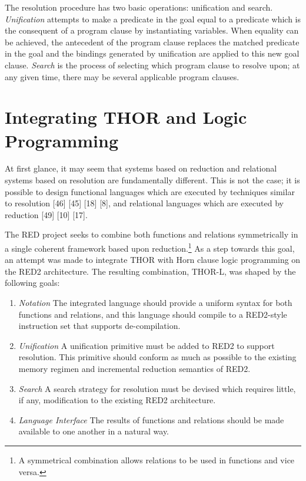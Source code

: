 The resolution procedure has two basic operations: unification and search.
\emph{Unification} attempts to make a predicate in the goal equal to a predicate which
is the consequent of a program clause by instantiating variables. When equality
can be achieved, the antecedent of the program clause replaces the matched
predicate in the goal and the bindings generated by unification are applied to
this new goal clause. \emph{Search} is the process of selecting which program clause to
resolve upon; at any given time, there may be several applicable program
clauses.

\section{Integrating THOR and Logic Programming}

At first glance, it may seem that \lambdacalculus{} systems based on reduction
and relational systems based on resolution are fundamentally different. This is
not the case; it is possible to design functional languages which are executed
by techniques similar to resolution [46] [45] [18] [8], and relational languages
which are executed by reduction [49] [10] [17].

The RED project seeks to combine both functions and relations symmetrically in a
single coherent framework based upon reduction.\footnote{A symmetrical
combination allows relations to be used in functions and vice versa.} As a step
towards this goal, an attempt was made to integrate THOR with Horn clause logic
programming on the RED2 architecture. The resulting combination, THOR-L, was
shaped by the following goals:

\begin{enumerate}
\item \emph{Notation} The integrated language should provide a uniform syntax
for both functions and relations, and this language should compile to a
RED2-style instruction set that supports de-compilation.
\item \emph{Unification} A unification primitive must be added to RED2 to
support resolution. This primitive should conform as much as possible to the
existing memory regimen and incremental reduction semantics of RED2.
\item \emph{Search} A search strategy for resolution must be devised which
requires little, if any, modification to the existing RED2 architecture.
\item \emph{Language Interface} The results of functions and relations should
be made available to one another in a natural way.
\end{enumerate}

